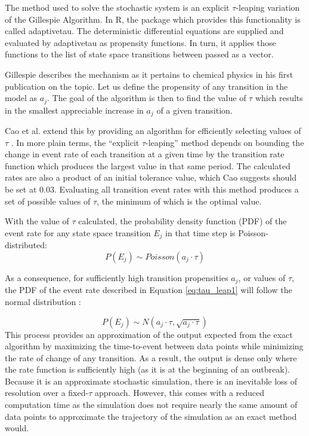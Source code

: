 \documentclass[../Paper.tex]{subfiles}
\begin{document}
The method used to solve the stochastic system is an explicit $\tau $-leaping
variation of the Gillespie Algorithm. In R, the package which provides this
functionality is called adaptivetau. The deterministic differential equations
are supplied and evaluated by adaptivetau as propensity functions.
In turn, it applies those functions to the list of state space transitions
between passed as a vector.

Gillespie describes the mechanism as it pertains to chemical physics in his
first publication on the topic\cite{gillespie_2001}.
Let us define the propensity of any transition in the model as $a_{j}$.
The goal of the algorithm is then to find the value of $\tau$ which
results in the smallest appreciable increase in $a_{j}$ of a given transition.

Cao et al. extend this by providing an algorithm for efficiently selecting
values of $\tau$ \cite{cao_gillespie_petzold_2007}. In more plain terms, the
``explicit $\tau$-leaping'' method depends on bounding the change in event rate
of each transition at a given time by the transition rate function which
produces the largest value in that same period.
The calculated rates are also a product of an initial tolerance value,
which Cao suggests should be set at 0.03. Evaluating all transition event rates
with this method produces a set of possible values of $\tau$, the minimum of
which is the optimal value.

With the value of $\tau$ calculated, the probability density function (PDF) of
the event rate for any state space transition $E_{j}$ in that time step is Poisson-distributed:
\begin{equation} \label{eq:tau_leap1}
P\left(E_{j}\right)\sim Poisson \left( a_{j}\cdot\tau \right)
\end{equation}

As a consequence, for sufficiently high transition propensities $a_{j}$,
or values of $\tau$, the PDF of the event rate described in Equation \ref{eq:tau_leap1}
will follow the normal distribution :

\begin{equation} \label{eq:tau_leap2}
P\left(E_{j}\right)\sim N \left( a_{j}\cdot\tau, \sqrt{a_{j}\cdot\tau} \right)
\end{equation}
This process provides an approximation of the output expected from the exact
algorithm by maximizing the time-to-event between data points while minimizing
the rate of change of any transition. As a result, the output is dense only where
the rate function is sufficiently high (as it is at the beginning of an outbreak).
Because it is an approximate stochastic simulation, there is an inevitable loss
of resolution over a fixed-$\tau$ approach.
However, this comes with a reduced computation time as the simulation does not
require nearly the same amount of data points to approximate the trajectory of
the simulation as an exact method would.
\end{document}
